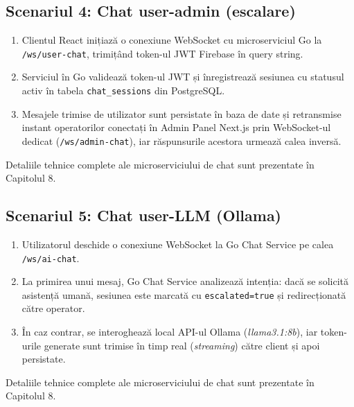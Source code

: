 \subsection{Scenariul 4: Chat user-admin (escalare)}
\begin{enumerate}
    \item Clientul React inițiază o conexiune WebSocket cu microserviciul Go la \texttt{/ws/user-chat}, trimițând token-ul JWT Firebase în query string.
    \item Serviciul în Go validează token-ul JWT și înregistrează sesiunea cu statusul activ în tabela \texttt{chat\_sessions} din PostgreSQL.
    \item Mesajele trimise de utilizator sunt persistate în baza de date și retransmise instant operatorilor conectați în Admin Panel Next.js prin WebSocket-ul dedicat (\texttt{/ws/admin-chat}), iar răspunsurile acestora urmează calea inversă.
\end{enumerate}
Detaliile tehnice complete ale microserviciului de chat sunt prezentate în Capitolul 8.

\subsection{Scenariul 5: Chat user-LLM (Ollama)}
\begin{enumerate}
    \item Utilizatorul deschide o conexiune WebSocket la Go Chat Service pe calea \texttt{/ws/ai-chat}.
    \item La primirea unui mesaj, Go Chat Service analizează intenția: dacă se solicită asistență umană, sesiunea este marcată cu \texttt{escalated=true} și redirecționată către operator.
    \item În caz contrar, se interoghează local API-ul Ollama (\textit{llama3.1:8b}), iar token-urile generate sunt trimise în timp real (\textit{streaming}) către client și apoi persistate.
\end{enumerate}
Detaliile tehnice complete ale microserviciului de chat sunt prezentate în Capitolul 8.

